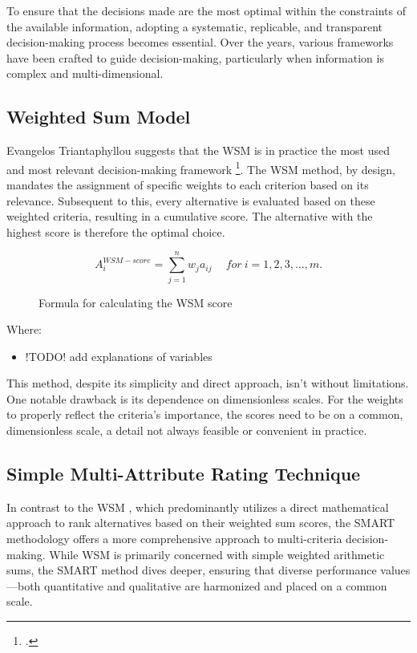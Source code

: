 To ensure that the decisions made are the most optimal within the constraints of the available information, adopting a systematic, replicable, and transparent decision-making process becomes essential. Over the years, various frameworks have been crafted to guide decision-making, 
particularly when information is complex and multi-dimensional.

\subsection{Weighted Sum Model}
Evangelos Triantaphyllou suggests that the \ac{WSM} is in practice the most used and most relevant decision-making framework \footcite[p. 1]{triantaphyllouIntroductionMultiCriteriaDecision2000}.
The \ac{WSM} method, by design, mandates the assignment of specific weights to each criterion based on its relevance. Subsequent to this, every alternative is evaluated based on these weighted criteria, resulting in a cumulative score.
The alternative with the highest score is therefore the optimal choice.


\begin{figure}[h]
    \centering
    \Large
    \[ A_{i}^{WSM-score} = \sum_{j=1}^{n} w_{j} a_{ij} \quad \ for \ i = 1, 2, 3, \dots, m. \]
    \caption{Formula for calculating the \ac*{WSM} score\protect\footnotemark} 
\end{figure}

Where:
\begin{itemize}
    \item !TODO! add explanations of variables
\end{itemize}

This method, despite its simplicity and direct approach, isn't without limitations.
One notable drawback is its dependence on dimensionless scales.
For the weights to properly reflect the criteria's importance, the scores need to be on a common, dimensionless scale, a detail not always feasible or convenient in practice.

\subsection{Simple Multi-Attribute Rating Technique}

In contrast to the \ac{WSM} , which predominantly utilizes a
direct mathematical approach to rank alternatives based on their weighted sum
scores, the \ac{SMART} methodology offers a more comprehensive approach to
multi-criteria decision-making. While \ac{WSM} is primarily concerned with simple
weighted arithmetic sums, the \ac{SMART} method dives deeper, ensuring that diverse
performance values—both quantitative and qualitative are harmonized and placed
on a common scale.

